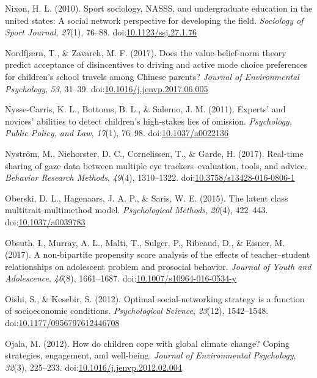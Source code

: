 \documentclass[english,man]{apa6}
\theoremstyle{definition}
\theoremstyle{definition}
\theoremstyle{definition}
\theoremstyle{remark}
\begin{document}
\hypertarget{ref-Nixon2010}{}
Nixon, H. L. (2010). Sport sociology, NASSS, and undergraduate education
in the united states: A social network perspective for developing the
field. \emph{Sociology of Sport Journal}, \emph{27}(1), 76--88.
doi:\href{https://doi.org/10.1123/ssj.27.1.76}{10.1123/ssj.27.1.76}

\hypertarget{ref-Nordfjuxe6rn2017}{}
Nordfjærn, T., \& Zavareh, M. F. (2017). Does the value-belief-norm
theory predict acceptance of disincentives to driving and active mode
choice preferences for children's school travels among Chinese parents?
\emph{Journal of Environmental Psychology}, \emph{53}, 31--39.
doi:\href{https://doi.org/10.1016/j.jenvp.2017.06.005}{10.1016/j.jenvp.2017.06.005}

\hypertarget{ref-Nysse-Carris2011}{}
Nysse-Carris, K. L., Bottoms, B. L., \& Salerno, J. M. (2011). Experts'
and novices' abilities to detect children's high-stakes lies of
omission. \emph{Psychology, Public Policy, and Law}, \emph{17}(1),
76--98. doi:\href{https://doi.org/10.1037/a0022136}{10.1037/a0022136}

\hypertarget{ref-Nystrom2017}{}
Nyström, M., Niehorster, D. C., Cornelissen, T., \& Garde, H. (2017).
Real-time sharing of gaze data between multiple eye
trackers--evaluation, tools, and advice. \emph{Behavior Research
Methods}, \emph{49}(4), 1310--1322.
doi:\href{https://doi.org/10.3758/s13428-016-0806-1}{10.3758/s13428-016-0806-1}

\hypertarget{ref-Oberski2015}{}
Oberski, D. L., Hagenaars, J. A. P., \& Saris, W. E. (2015). The latent
class multitrait-multimethod model. \emph{Psychological Methods},
\emph{20}(4), 422--443.
doi:\href{https://doi.org/10.1037/a0039783}{10.1037/a0039783}

\hypertarget{ref-Obsuth2017}{}
Obsuth, I., Murray, A. L., Malti, T., Sulger, P., Ribeaud, D., \&
Eisner, M. (2017). A non-bipartite propensity score analysis of the
effects of teacher--student relationships on adolescent problem and
prosocial behavior. \emph{Journal of Youth and Adolescence},
\emph{46}(8), 1661--1687.
doi:\href{https://doi.org/10.1007/s10964-016-0534-y}{10.1007/s10964-016-0534-y}

\hypertarget{ref-Oishi2012}{}
Oishi, S., \& Kesebir, S. (2012). Optimal social-networking strategy is
a function of socioeconomic conditions. \emph{Psychological Science},
\emph{23}(12), 1542--1548.
doi:\href{https://doi.org/10.1177/0956797612446708}{10.1177/0956797612446708}

\hypertarget{ref-Ojala2012}{}
Ojala, M. (2012). How do children cope with global climate change?
Coping strategies, engagement, and well-being. \emph{Journal of
Environmental Psychology}, \emph{32}(3), 225--233.
doi:\href{https://doi.org/10.1016/j.jenvp.2012.02.004}{10.1016/j.jenvp.2012.02.004}
\end{document}
